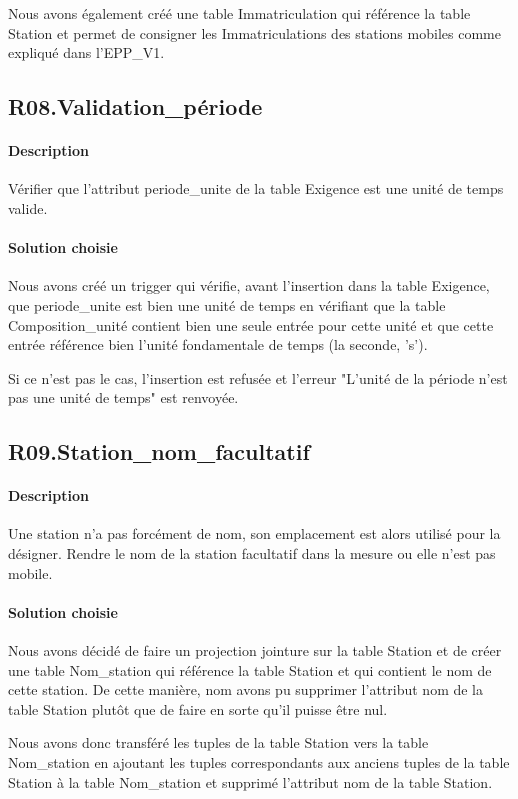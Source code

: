 \documentclass{article}
\begin{document}
Nous avons également créé une table Immatriculation qui référence la table Station
et permet de consigner les Immatriculations des stations mobiles comme
expliqué dans l'EPP\_V1.

\subsection{R08.Validation\_période}
\paragraph{Description} Vérifier que l'attribut periode\_unite de la table Exigence
est une unité de temps valide.

\paragraph{Solution choisie}
Nous avons créé un trigger qui vérifie, avant l'insertion dans la table Exigence,
que periode\_unite est bien une unité de temps en vérifiant que la table
Composition\_unité contient bien une seule entrée pour cette unité et que
cette entrée référence bien l'unité fondamentale de temps (la seconde, 's').

Si ce n'est pas le cas, l'insertion est refusée et l'erreur "L'unité de la période n'est pas une unité de temps"
est renvoyée.

\subsection{R09.Station\_nom\_facultatif}
\paragraph{Description} Une station n'a pas forcément de nom, son emplacement
est alors utilisé pour la désigner. Rendre le nom de la station facultatif 
dans la mesure ou elle n'est pas mobile.

\paragraph{Solution choisie}
Nous avons décidé de faire un projection jointure sur la table Station
et de créer une table Nom\_station qui référence la table Station et qui
contient le nom de cette station. De cette manière, nom avons pu supprimer
l'attribut nom de la table Station plutôt que de faire en sorte qu'il puisse être
nul.

Nous avons donc transféré les tuples de la table Station vers la table Nom\_station
en ajoutant les tuples correspondants aux anciens tuples de la table Station à la table Nom\_station
et supprimé l'attribut nom de la table Station.
\end{document}
